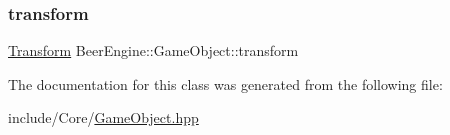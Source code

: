 \subsubsection{\texorpdfstring{transform}{transform}}
{\footnotesize\ttfamily \mbox{\hyperlink{class_beer_engine_1_1_transform}{Transform}} Beer\+Engine\+::\+Game\+Object\+::transform}



The documentation for this class was generated from the following file\+:\begin{DoxyCompactItemize}
\item 
include/\+Core/\mbox{\hyperlink{_game_object_8hpp}{Game\+Object.\+hpp}}\end{DoxyCompactItemize}

